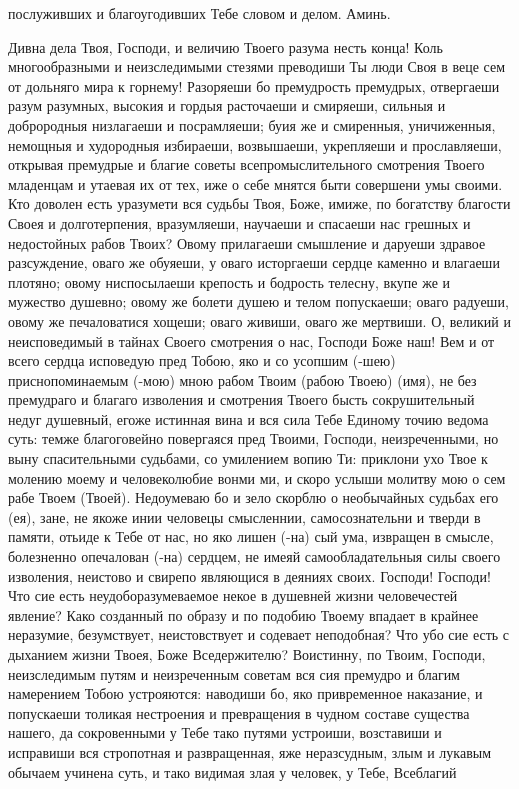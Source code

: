\begin{mymulticols}
послуживших и благоугодивших Тебе словом и делом. Аминь. 

\end{mymulticols}

\mychapterending


\begin{mymulticols}

Дивна дела Твоя, Господи, и величию Твоего разума несть конца! Коль многообразными и неизследимыми стезями преводиши Ты люди Своя в веце сем от дольняго мира к горнему! Разоряеши бо премудрость премудрых, отвергаеши разум разумных, высокия и гордыя расточаеши и смиряеши, сильныя и доброродныя низлагаеши и посрамляеши; буия же и смиренныя, уничиженныя, немощныя и худородныя избираеши, возвышаеши, укрепляеши и прославляеши, открывая премудрые и благие советы всепромыслительного смотрения Твоего младенцам и утаевая их от тех, иже о себе мнятся быти совершени умы своими. Кто доволен есть уразумети вся судьбы Твоя, Боже, имиже, по богатству благости Своея и долготерпения, вразумляеши, научаеши и спасаеши нас грешных и недостойных рабов Твоих? Овому прилагаеши смышление и даруеши здравое разсуждение, оваго же обуяеши, у оваго исторгаеши сердце каменно и влагаеши плотяно; овому ниспосылаеши крепость и бодрость телесну, вкупе же и мужество душевно; овому же болети душею и телом попускаеши; оваго радуеши, овому же печаловатися хощеши; оваго живиши, оваго же мертвиши. О, великий и неисповедимый в тайнах Своего смотрения о нас, Господи Боже наш! Вем и от всего сердца исповедую пред Тобою, яко и со усопшим (-шею) приснопоминаемым (-мою) мною рабом Твоим (рабою Твоею) (имя), не без премудраго и благаго изволения и смотрения Твоего бысть сокрушительный недуг душевный, егоже истинная вина и вся сила Тебе Единому точию ведома суть: темже благоговейно повергаяся пред Твоими, Господи, неизреченными, но выну спасительными судьбами, со умилением вопию Ти: приклони ухо Твое к молению моему и человеколюбие вонми ми, и скоро услыши молитву мою о сем рабе Твоем (Твоей). Недоумеваю бо и зело скорблю о необычайных судьбах его (ея), зане, не якоже инии человецы смысленнии, самосознательни и тверди в памяти, отьиде к Тебе от нас, но яко лишен (-на) сый ума, извращен в смысле, болезненно опечалован (-на) сердцем, не имеяй самообладательныя силы своего изволения, неистово и свирепо являющися в деяниях своих. Господи! Господи! Что сие есть неудоборазумеваемое некое в душевней жизни человечестей явление? Како созданный по образу и по подобию Твоему впадает в крайнее неразумие, безумствует, неистовствует и содевает неподобная? Что убо сие есть с дыханием жизни Твоея, Боже Вседержителю? Воистинну, по Твоим, Господи, неизследимым путям и неизреченным советам вся сия премудро и благим намерением Тобою устрояются: наводиши бо, яко привременное наказание, и попускаеши толикая нестроения и превращения в чудном составе существа нашего, да сокровенными у Тебе тако путями устроиши, возставиши и исправиши вся стропотная и развращенная, яже неразсудным, злым и лукавым обычаем учинена суть, и тако видимая злая у человек, у Тебе, Всеблагий 
\end{mymulticols}
